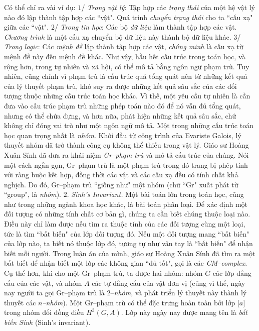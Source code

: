 \begin{multicols}{2}
	Có thể chỉ ra vài ví dụ:
	\vskip 0.1cm
	$1$/ \textit{Trong vật lý}: Tập hợp các \textit{trạng thái} của một  hệ vật lý nào đó lập thành tập hợp các ``vật". Quá trình \textit{chuyển trạng thái} cho ta ``cấu xạ" giữa các ``vật".
	\vskip 0.1cm
	$2$/ \textit{Trong tin học}: Các bộ \textit{dữ liệu} làm thành tập hợp các vật. \textit{Chương trình} là một cấu xạ chuyển bộ dữ liệu này thành bộ dữ liệu khác.
	\vskip 0.1cm
	$3$/ \textit{Trong logic}: Các \textit{mệnh đề} lập thành tập hợp các vật, \textit{chứng minh} là cấu xạ từ mệnh đề này đến mệnh đề khác.
	\vskip 0.1cm
	Như vậy, hầu hết cấu trúc trong toán học, và rộng hơn, trong tự nhiên và xã hội, có thể mô tả bằng ngôn ngữ phạm trù. Tuy nhiên, cũng chính vì phạm trù là cấu trúc quá tổng quát nên từ những kết quả của lý thuyết phạm trù, khó suy ra được những kết quả sâu sắc của các đối tượng thuộc những cấu trúc toán học khác. Vì thế, một yêu cầu tự nhiên là cần đưa vào cấu trúc phạm trù những phép toán nào đó để nó vẫn đủ tổng quát, nhưng có thể chứa đựng, và hơn nữa,  phát hiện những kết quả sâu sắc, chứ không chỉ đóng vai trò như một ngôn ngữ mô tả.
	\vskip 0.1cm
	Một trong những cấu trúc toán học quan trọng nhất là \textit{nhóm}. Khởi đầu từ công trình của Evariste Galois, lý thuyết nhóm đã trở thành công cụ không thể thiếu trong vật lý. Giáo sư Hoàng Xuân Sính đã đưa ra khái niệm \textit{Gr--phạm trù} và mô tả cấu trúc của chúng. Nói một cách ngắn gọn,  Gr--phạm trù là một phạm trù trong đó trang bị phép tính với ràng buộc kết hợp, đồng thời các vật và các cấu xạ đều có tính chất khả nghịch. Do đó, Gr--phạm trù ``giống như" một nhóm (chữ ``Gr" xuất phát từ ``group", là \textit{nhóm}).
	\vskip 0.1cm
	$2$. \textit{Sinh's Invariant.}
	\vskip 0.1cm
	Một bài toán lớn trong toán học, cũng như trong những ngành khoa học khác, là bài toán phân loại. Để xác định một đối tượng có những tính chất cơ bản gì, chúng ta cần biết chúng thuộc loại nào. Điều này chỉ làm được nếu tìm ra thuộc tính của các đối tượng cùng một  loại, tức là tìm ``bất biến" của lớp đối tượng đó. Nếu một đối tượng mang ``bất biến" của lớp nào, ta biết nó thuộc lớp đó,  tương tự như vân tay là ``bất biến" để nhận biết mỗi người.
	\vskip 0.1cm
	Trong luận án của mình, giáo sư Hoàng Xuân Sính đã tìm ra một bất biết để nhận biết một lớp các không gian ``đủ tốt", gọi là các \textit{CM--complex}. Cụ thể hơn, khi cho một Gr--phạm trù, ta được hai nhóm: nhóm $G$ các lớp đẳng cấu của các vật, và nhóm $A$ các tự đẳng cấu của vật đơn vị (cũng vì thế, ngày nay người ta gọi Gr--phạm trù là $2$--\textit{nhóm}, và phát triển lý thuyết này thành lý thuyết các \textit{$n$--nhóm}). Một Gr--phạm trù có thể đặc trưng hoàn toàn bởi lớp [$a$] trong nhóm đối đồng điều $H^3(G, A)$. Lớp này ngày nay được mang tên là \textit{bất biến Sính} (Sinh's invariant).

\end{multicols}
